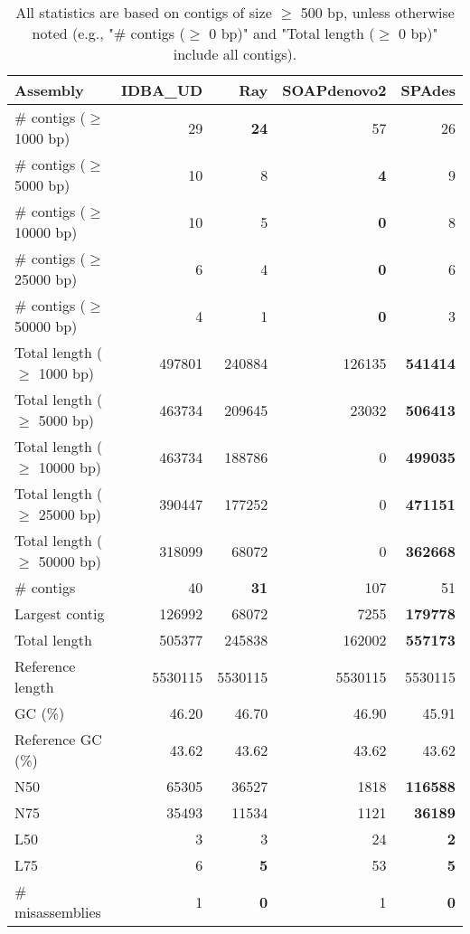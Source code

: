 \documentclass[12pt,a4paper]{article}
\begin{document}
\begin{table}[ht]
\begin{center}
\caption{All statistics are based on contigs of size $\geq$ 500 bp, unless otherwise noted (e.g., "\# contigs ($\geq$ 0 bp)" and "Total length ($\geq$ 0 bp)" include all contigs).}
\begin{tabular}{|l*{4}{|r}|}
\hline
Assembly & IDBA\_UD & Ray & SOAPdenovo2 & SPAdes \\ \hline
\# contigs ($\geq$ 1000 bp) & 29 & {\bf 24} & 57 & 26 \\ \hline
\# contigs ($\geq$ 5000 bp) & 10 & 8 & {\bf 4} & 9 \\ \hline
\# contigs ($\geq$ 10000 bp) & 10 & 5 & {\bf 0} & 8 \\ \hline
\# contigs ($\geq$ 25000 bp) & 6 & 4 & {\bf 0} & 6 \\ \hline
\# contigs ($\geq$ 50000 bp) & 4 & 1 & {\bf 0} & 3 \\ \hline
Total length ($\geq$ 1000 bp) & 497801 & 240884 & 126135 & {\bf 541414} \\ \hline
Total length ($\geq$ 5000 bp) & 463734 & 209645 & 23032 & {\bf 506413} \\ \hline
Total length ($\geq$ 10000 bp) & 463734 & 188786 & 0 & {\bf 499035} \\ \hline
Total length ($\geq$ 25000 bp) & 390447 & 177252 & 0 & {\bf 471151} \\ \hline
Total length ($\geq$ 50000 bp) & 318099 & 68072 & 0 & {\bf 362668} \\ \hline
\# contigs & 40 & {\bf 31} & 107 & 51 \\ \hline
Largest contig & 126992 & 68072 & 7255 & {\bf 179778} \\ \hline
Total length & 505377 & 245838 & 162002 & {\bf 557173} \\ \hline
Reference length & 5530115 & 5530115 & 5530115 & 5530115 \\ \hline
GC (\%) & 46.20 & 46.70 & 46.90 & 45.91 \\ \hline
Reference GC (\%) & 43.62 & 43.62 & 43.62 & 43.62 \\ \hline
N50 & 65305 & 36527 & 1818 & {\bf 116588} \\ \hline
N75 & 35493 & 11534 & 1121 & {\bf 36189} \\ \hline
L50 & 3 & 3 & 24 & {\bf 2} \\ \hline
L75 & 6 & {\bf 5} & 53 & {\bf 5} \\ \hline
\# misassemblies & 1 & {\bf 0} & 1 & {\bf 0} \\ \hline

\end{tabular}
\end{center}
\end{table}
\end{document}
